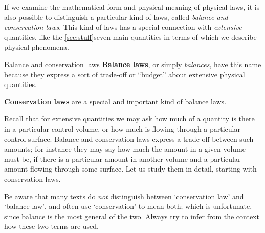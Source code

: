 \documentclass[a4paper,12pt,%
onecolumn,oneside,titlepage,%
british%
]{memoir}
\renewcommand*{\|}[1][]{\nonscript\:#1\vert\nonscript\:\mathopen{}}
\begin{document}
If we examine the mathematical form and physical meaning of physical laws, it is also possible to distinguish a particular kind of laws, called \emph{balance and conservation laws}. This kind of laws has a special connection with \emph{extensive} quantities, like the \ref{sec:stuff}{seven main quantities} in terms of which we describe physical phenomena.
\begin{definition}{Balance and conservation laws}
  \textbf{Balance laws}, or simply \emph{balances}, have this name because they express a sort of trade-off or \enquote{budget} about extensive physical quantities.

  \textbf{Conservation laws} are a special and important kind of balance laws.
\end{definition}
%

Recall that for extensive quantities we may ask how much of a quantity is there in a particular control volume, or how much is flowing through a particular control surface. Balance and conservation laws express a trade-off between such amounts; for instance they may say how much the amount in a given volume must be, if there is a particular amount in another volume and a particular amount flowing through some surface. Let us study them in detail, starting with conservation laws.


\begin{warning}[\enquote*{Conservation} vs \enquote*{balance} in other texts,label={wa:conservation}]
  Be aware that many texts do \emph{not} distinguish between \enquote*{conservation law} and \enquote*{balance law}, and often use \enquote*{conservation} to mean both; which is unfortunate, since balance is the most general of the two. Always try to infer from the context how these two terms are used.
\end{warning}
\end{document}
